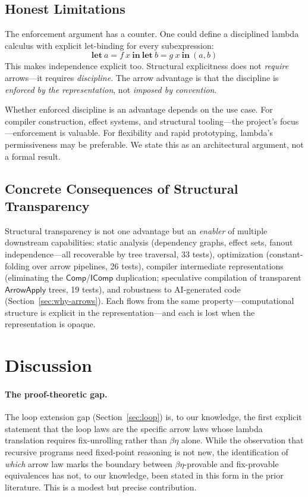 \documentclass[11pt,a4paper]{article}
\theoremstyle{definition}
\theoremstyle{remark}
\newcommand{\ArrowApply}{\mathsf{ArrowApply}}
\begin{document}
\subsection{Honest Limitations}

The enforcement argument has a counter. One could define a disciplined
lambda calculus with explicit let-binding for every subexpression:
\[
\mathbf{let}\ a = f\ x\ \mathbf{in}\ \mathbf{let}\ b = g\ x\
\mathbf{in}\ (a, b)
\]
This makes independence explicit too. Structural explicitness does not
\emph{require} arrows---it requires \emph{discipline}. The arrow
advantage is that the discipline is \emph{enforced by the representation},
not \emph{imposed by convention}.

Whether enforced discipline is an advantage depends on the use case.
For compiler construction, effect systems, and structural tooling---the
project's focus---enforcement is valuable. For flexibility and rapid
prototyping, lambda's permissiveness may be preferable. We state this
as an architectural argument, not a formal result.

\subsection{Concrete Consequences of Structural Transparency}\label{sec:consequences}

Structural transparency is not one advantage but an \emph{enabler} of
multiple downstream capabilities: static analysis (dependency graphs,
effect sets, fanout independence---all recoverable by tree traversal,
33 tests), optimization (constant-folding over arrow pipelines, 26
tests), compiler intermediate representations (eliminating the
$\mathsf{Comp}$/$\mathsf{IComp}$ duplication; speculative compilation of
transparent $\ArrowApply$ trees, 19 tests), and robustness to
AI-generated code (Section~\ref{sec:why-arrows}). Each flows from the
same property---computational structure is explicit in the
representation---and each is lost when the representation is opaque.

\section{Discussion}\label{sec:discussion}

\paragraph{The proof-theoretic gap.}
The loop extension gap (Section~\ref{sec:loop}) is, to our knowledge, the first
explicit statement that the loop laws are the specific arrow laws whose
lambda translation requires fix-unrolling rather than $\beta\eta$ alone.
While the observation that recursive programs need fixed-point reasoning is
not new, the identification of \emph{which} arrow law marks the boundary
between $\beta\eta$-provable and fix-provable equivalences has not, to our
knowledge, been stated in this form in the prior literature. This is a
modest but precise contribution.
\end{document}
